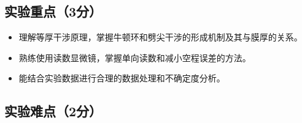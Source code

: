 \documentclass[]{../template/Report}%
\begin{document}
\subsection{实验重点（3分）}

\begin{itemize}
  \item 理解等厚干涉原理，掌握牛顿环和劈尖干涉的形成机制及其与膜厚的关系。
  \item 熟练使用读数显微镜，掌握单向读数和减小空程误差的方法。
  \item 能结合实验数据进行合理的数据处理和不确定度分析。
\end{itemize}

\subsection{实验难点（2分）}
\end{document}
